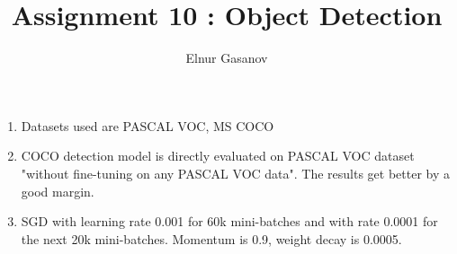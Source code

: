 \documentclass{article}
\title{Assignment 10 : Object Detection}
\author{Elnur Gasanov}
\begin{document}
\maketitle

\begin{enumerate}
	\item Datasets used are PASCAL VOC, MS COCO
	\item COCO detection model is directly evaluated on PASCAL VOC dataset "without fine-tuning on any PASCAL VOC data". The results get better by a good margin.
	\item SGD with learning rate 0.001 for 60k mini-batches and with rate 0.0001 for the next 20k mini-batches. Momentum is 0.9, weight decay is 0.0005.
\end{enumerate}
\end{document}
